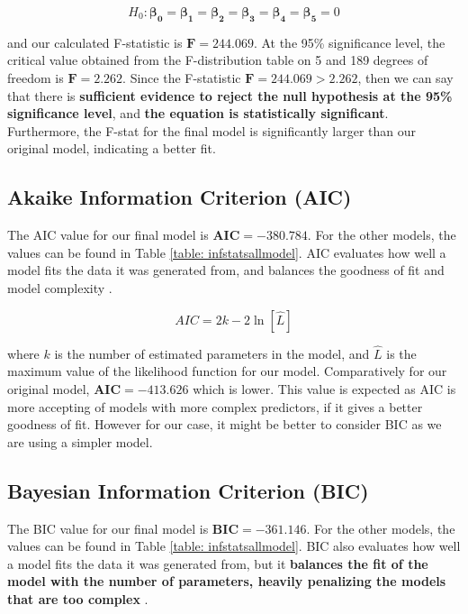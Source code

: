 \documentclass{article}
\begin{document}
\begin{equation}
    H_0: \bm{\beta_0} = \bm{\beta_1} = \bm{\beta_2} = \bm{\beta_3} = \bm{\beta_4} = \bm{\beta_5} = 0
\end{equation}

\noindent and our calculated F-statistic is $\bm{F = 244.069}$. At the 95\% significance level, the critical value obtained from the F-distribution table on 5 and 189 degrees of freedom is $\bm{F = 2.262}$. Since the F-statistic $\bm{F = 244.069 > 2.262}$, then we can say that there is \textbf{sufficient evidence to reject the null hypothesis at the 95\% significance level}, and \textbf{the equation is statistically significant}. Furthermore, the F-stat for the final model is significantly larger than our original model, indicating a better fit.

\subsection{Akaike Information Criterion (AIC)}
The AIC value for our final model is $\bm{AIC} = -380.784$. For the other models, the values can be found in Table \ref{table: infstatsallmodel}. AIC evaluates how well a model fits the data it was generated from, and balances the goodness of fit and model complexity \cite{AICBIC}. 

\begin{equation}
    AIC = 2k - 2\ln{[\hat{L}]}
\end{equation}

\noindent where $k$ is the number of estimated parameters in the model, and $\hat{L}$ is the maximum value of the likelihood function for our model. Comparatively for our original model, $\bm{AIC} = -413.626$ which is lower. This value is expected as AIC is more accepting of models with more complex predictors, if it gives a better goodness of fit. However for our case, it might be better to consider BIC as we are using a simpler model.

\subsection{Bayesian Information Criterion (BIC)}
The BIC value for our final model is $\bm{BIC} = -361.146$. For the other models, the values can be found in Table \ref{table: infstatsallmodel}. BIC also evaluates how well a model fits the data it was generated from, but it \textbf{balances the fit of the model with the number of parameters, heavily penalizing the models that are too complex} \cite{AICBIC}.
\end{document}
